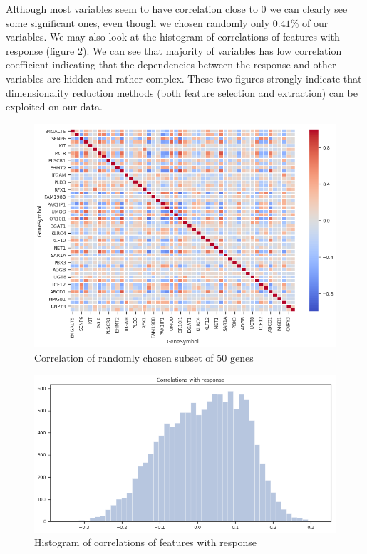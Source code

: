\documentclass[shortabstract, english, mgr]{iithesis}
\begin{document}
Although most variables seem to have correlation close to $0$ we can clearly see some significant ones, even though we chosen randomly only $0.41$\% of our variables. We may also look at the histogram of correlations of features with response (figure \ref{fig:corrHist}). We can see that majority of variables has low correlation coefficient indicating that the dependencies between the response and other variables are hidden and rather complex. These two figures strongly indicate that dimensionality reduction methods (both feature selection and extraction) can be exploited on our data.

\begin{figure}
\centering
\includegraphics[width=\textwidth]{images/heatmap.png}
\caption{Correlation of randomly chosen subset of $50$ genes}
\label{fig:heatmap}
\end{figure}

\begin{figure}
\centering
\includegraphics[width=\textwidth]{images/corrHist.png}
\caption{Histogram of correlations of features with response}
\label{fig:corrHist}
\end{figure}
\end{document}

